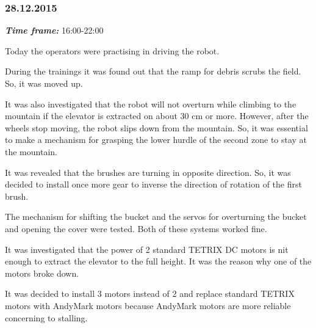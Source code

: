 \subsubsection{28.12.2015}
\textit{\textbf{Time frame:}} 16:00-22:00

Today the operators were practising in driving the robot.

During the trainings it was found out that the ramp for debris scrubs the field. So, it was moved up.

It was also investigated that the robot will not overturn while climbing to the mountain if the elevator is extracted on about 30 cm or more. However, after the wheels stop moving, the robot slips down from the mountain. So, it was essential to make a mechanism for grasping the lower hurdle of the second zone to stay at the mountain.

It was revealed that the brushes are turning in opposite direction. So, it was decided to install once more gear to inverse the direction of rotation of the first brush.

The mechanism for shifting the bucket and the servos for overturning the bucket and opening the cover were tested. Both of these systems worked fine.

It was investigated that the power of 2 standard TETRIX DC motors is nit enough to extract the elevator to the full height. It was the reason why one of the motors broke down.

It was decided to install 3 motors instead of 2 and replace standard TETRIX motors with AndyMark motors because AndyMark motors are more reliable concerning to stalling.

